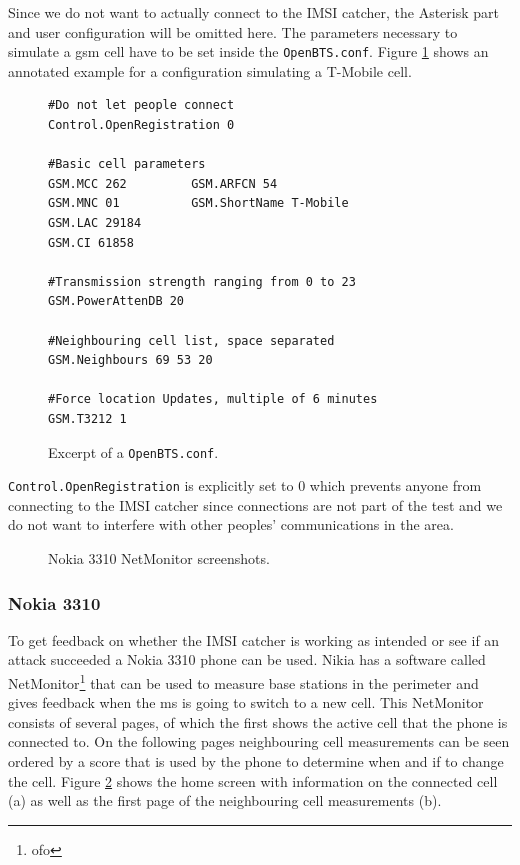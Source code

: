 Since we do not want to actually connect to the IMSI catcher, the Asterisk part and user configuration will be omitted here.
The parameters necessary to simulate a \gls{gsm} cell have to be set inside the \texttt{OpenBTS.conf}.
Figure \ref{fig:openbts_parameters} shows an annotated example for a configuration simulating a T-Mobile cell.
\begin{figure}
\begin{lstlisting}
#Do not let people connect
Control.OpenRegistration 0

#Basic cell parameters
GSM.MCC 262			GSM.ARFCN 54
GSM.MNC 01			GSM.ShortName T-Mobile
GSM.LAC 29184		
GSM.CI 61858
	
#Transmission strength ranging from 0 to 23
GSM.PowerAttenDB 20

#Neighbouring cell list, space separated
GSM.Neighbours 69 53 20

#Force location Updates, multiple of 6 minutes
GSM.T3212 1
\end{lstlisting}
\caption{Excerpt of a \texttt{OpenBTS.conf}.}
\label{fig:openbts_parameters}
\end{figure}
\texttt{Control.OpenRegistration} is explicitly set to 0 which prevents anyone from connecting to the IMSI catcher since connections are not part of the test and we do not want to interfere with other peoples' communications in the area.

\begin{figure}
\centering
{}
\caption{Nokia 3310 NetMonitor screenshots.}
\label{fig:netmonitor}
\end{figure}

\subsubsection{Nokia 3310}
To get feedback on whether the IMSI catcher is working as intended or see if an attack succeeded a Nokia 3310 phone can be used.
Nikia has a software called NetMonitor\footnote{ofo} that can be used to measure base stations in the perimeter and gives feedback when the \gls{ms} is going to switch to a new cell.
This NetMonitor consists of several pages, of which the first shows the active cell that the phone is connected to.
On the following pages neighbouring cell measurements can be seen ordered by a score that is used by the phone to determine when and if to change the cell.
Figure \ref{fig:netmonitor} shows the home screen with information on the connected cell (a) as well as the first page of the neighbouring cell measurements (b).

